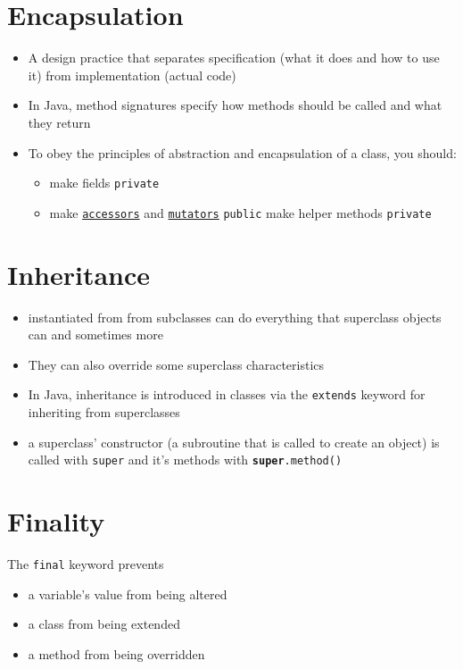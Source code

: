 \documentclass{article}
\begin{document}
\section{Encapsulation}
\begin{itemize}
    \item A design practice that separates specification (what it does and how to use it) from implementation (actual code)
    \item In Java, method signatures specify how methods should be called and what they return
    \item To obey the principles of abstraction and encapsulation of a class, you should:
    \begin{itemize}
        \item make fields \texttt{private}
        \item make \hyperref[itm:accessor]{\texttt{accessors}} and  \hyperref[itm:mutator]{\texttt{mutators}} \texttt{public}
        make helper methods \texttt{private}
    \end{itemize}
\end{itemize}

\section{Inheritance}
\begin{itemize}
    \item instantiated from from subclasses can do everything that superclass objects can and sometimes more
    \item They can also override some superclass characteristics
    \item In Java, inheritance is introduced in classes via the \texttt{extends} keyword for inheriting from superclasses
    \item a superclass' constructor (a subroutine that is called to create an object) is called with \texttt{super} and it's methods with \texttt{\textbf{super}.method()}
\end{itemize}    

\section{Finality}
The \texttt{final} keyword prevents 
\begin{itemize}
    \item a variable's value from being altered
    \item a class from being extended
    \item a method from being overridden
\end{itemize}
\end{document}
